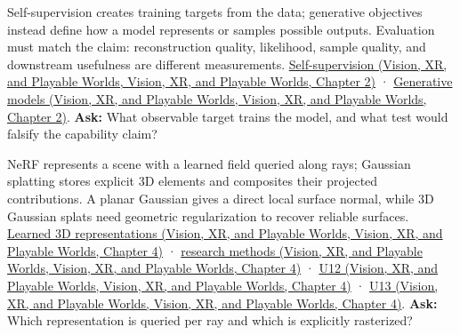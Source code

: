 Self-supervision creates training targets from the data; generative objectives instead define how a model represents or samples possible outputs. Evaluation must match the claim: reconstruction quality, likelihood, sample quality, and downstream usefulness are different measurements. \href{../07-Vision-XR-and-Playable-Worlds/main.pdf\#nameddest=04-visual-computing-ii-ch031-self-supervision-and-evaluation}{Self-supervision (Vision, XR, and Playable Worlds, Vision, XR, and Playable Worlds, Chapter 2)} · \href{../07-Vision-XR-and-Playable-Worlds/main.pdf\#nameddest=04-visual-computing-ii-ch031-generative-models-learn-distributions-and-samplers}{Generative models (Vision, XR, and Playable Worlds, Vision, XR, and Playable Worlds, Chapter 2)}. \textbf{Ask:} What observable target trains the model, and what test would falsify the capability claim?

NeRF represents a scene with a learned field queried along rays; Gaussian splatting stores explicit 3D elements and composites their projected contributions. A planar Gaussian gives a direct local surface normal, while 3D Gaussian splats need geometric regularization to recover reliable surfaces. \href{../07-Vision-XR-and-Playable-Worlds/main.pdf\#nameddest=04-visual-computing-ii-ch034-learned-representations-of-3d-shape-and-scenes}{Learned 3D representations (Vision, XR, and Playable Worlds, Vision, XR, and Playable Worlds, Chapter 4)} · \href{../07-Vision-XR-and-Playable-Worlds/main.pdf\#nameddest=04-visual-computing-ii-ch034-from-scene-representations-to-research-methods}{research methods (Vision, XR, and Playable Worlds, Vision, XR, and Playable Worlds, Chapter 4)} · \href{../07-Vision-XR-and-Playable-Worlds/main.pdf\#nameddest=04-visual-computing-ii-ch034-figure-u12---volume-compositing-accumulates-visible-contributions}{U12 (Vision, XR, and Playable Worlds, Vision, XR, and Playable Worlds, Chapter 4)} · \href{../07-Vision-XR-and-Playable-Worlds/main.pdf\#nameddest=04-visual-computing-ii-ch034-figure-u13---a-local-gaussian-covariance-projects-to-an-ellipse}{U13 (Vision, XR, and Playable Worlds, Vision, XR, and Playable Worlds, Chapter 4)}. \textbf{Ask:} Which representation is queried per ray and which is explicitly rasterized?

